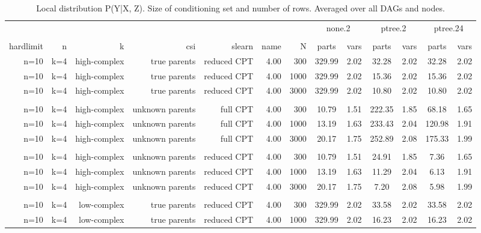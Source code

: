 \begin{table}[ht]
\centering
\caption{Local distribution P(Y|X, Z). Size of conditioning set and number of rows. Averaged over all DAGs and nodes.} 
\begin{tabular}{rrrrrrr|cc|cc|cc}
  \toprule
   & & & & & & &\multicolumn{2}{c}{none.2}&\multicolumn{2}{c}{ptree.2}&\multicolumn{2}{c}{ptree.24}   \\ 
 \cline{8-13}  \\ 
 hardlimit & n & k & csi & slearn & name & N & parts & vars & parts & vars & parts & vars  \\ 
 \midrule
n=10 & k=4 & high-complex & true parents & reduced CPT & 4.00 & 300 & 329.99 & 2.02 & 32.28 & 2.02 & 32.28 & 2.02 \\ 
  n=10 & k=4 & high-complex & true parents & reduced CPT & 4.00 & 1000 & 329.99 & 2.02 & 15.36 & 2.02 & 15.36 & 2.02 \\ 
  n=10 & k=4 & high-complex & true parents & reduced CPT & 4.00 & 3000 & 329.99 & 2.02 & 10.80 & 2.02 & 10.80 & 2.02 \\ 
   \\ 
n=10 & k=4 & high-complex & unknown parents & full CPT & 4.00 & 300 & 10.79 & 1.51 & 222.35 & 1.85 & 68.18 & 1.65 \\ 
  n=10 & k=4 & high-complex & unknown parents & full CPT & 4.00 & 1000 & 13.19 & 1.63 & 233.43 & 2.04 & 120.98 & 1.91 \\ 
  n=10 & k=4 & high-complex & unknown parents & full CPT & 4.00 & 3000 & 20.17 & 1.75 & 252.89 & 2.08 & 175.33 & 1.99 \\ 
   \\ 
n=10 & k=4 & high-complex & unknown parents & reduced CPT & 4.00 & 300 & 10.79 & 1.51 & 24.91 & 1.85 & 7.36 & 1.65 \\ 
  n=10 & k=4 & high-complex & unknown parents & reduced CPT & 4.00 & 1000 & 13.19 & 1.63 & 11.29 & 2.04 & 6.13 & 1.91 \\ 
  n=10 & k=4 & high-complex & unknown parents & reduced CPT & 4.00 & 3000 & 20.17 & 1.75 & 7.20 & 2.08 & 5.98 & 1.99 \\ 
   \\ 
n=10 & k=4 & low-complex & true parents & reduced CPT & 4.00 & 300 & 329.99 & 2.02 & 33.58 & 2.02 & 33.58 & 2.02 \\ 
  n=10 & k=4 & low-complex & true parents & reduced CPT & 4.00 & 1000 & 329.99 & 2.02 & 16.23 & 2.02 & 16.23 & 2.02 \\ 

\end{tabular}
\end{table}
